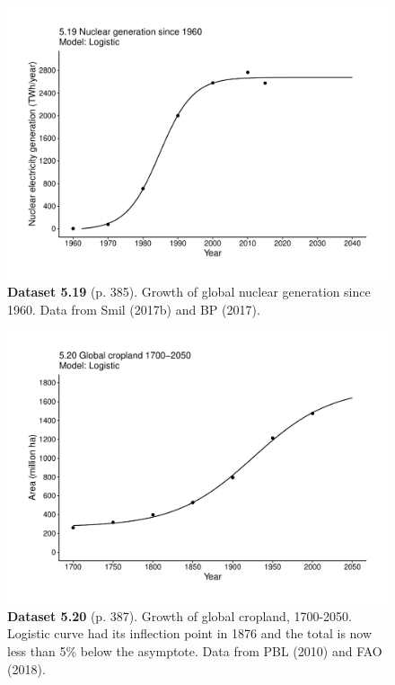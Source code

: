 \documentclass[aps,rmp,preprint,superscriptaddress,10pt,onecolumn]{article}
\begin{document}
\clearpage
\begin{figure}[h]
\includegraphics[width=\textwidth]{output/figs-ggplot/5.19.pdf}
\caption*{\textbf{Dataset 5.19} (p. 385). Growth of global nuclear generation since 1960. Data from Smil (2017b) and BP (2017).}
\end{figure}
	
\clearpage
\begin{figure}[h]
\includegraphics[width=\textwidth]{output/figs-ggplot/5.20.pdf}
\caption*{\textbf{Dataset 5.20} (p. 387). Growth of global cropland, 1700-2050. Logistic curve had its inflection point in 1876 and the total is now less than 5\% below the asymptote. Data from PBL (2010) and FAO (2018).}
\end{figure}
	
\end{document}
